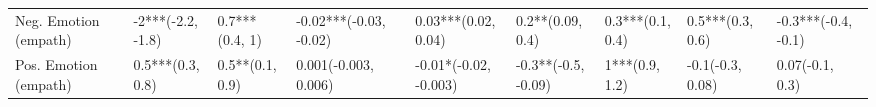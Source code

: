 \begin{tabular}{lllllllll}
Neg. Emotion (empath) &    -2***(-2.2, -1.8) &    0.7***(0.4, 1) &   -0.02***(-0.03, -0.02) &     0.03***(0.02, 0.04) &     0.2**(0.09, 0.4) &     0.3***(0.1, 0.4) &     0.5***(0.3, 0.6) &  -0.3***(-0.4, -0.1) \\
Pos. Emotion (empath) &     0.5***(0.3, 0.8) &   0.5**(0.1, 0.9) &     0.001(-0.003, 0.006) &   -0.01*(-0.02, -0.003) &  -0.3**(-0.5, -0.09) &       1***(0.9, 1.2) &     -0.1(-0.3, 0.08) &      0.07(-0.1, 0.3) \\
\bottomrule
\end{tabular}
